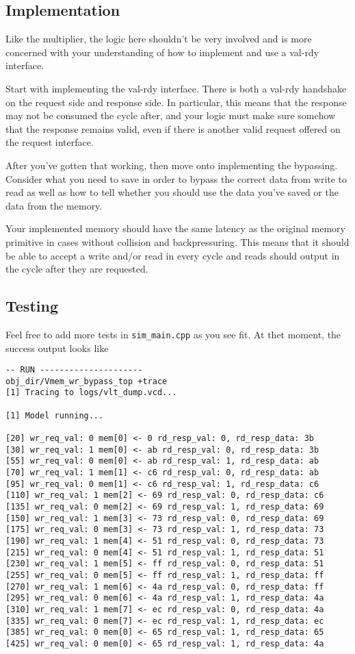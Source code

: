 \documentclass{article}
\begin{document}
\subsection*{Implementation}
Like the multiplier, the logic here shouldn't be very involved and is more
concerned with your understanding of how to implement and use a val-rdy
interface.

Start with implementing the val-rdy interface. There is both a val-rdy handshake
on the request side and response side. In particular, this means that the
response may not be consumed the cycle after, and your logic must make sure
somehow that the response remains valid, even if there is another valid request
offered on the request interface.

After you've gotten that working, then move onto implementing the bypassing.
Consider what you need to save in order to bypass the correct data from write to
read as well as how to tell whether you should use the data you've saved or the
data from the memory.

Your implemented memory should have the same latency as the original memory
primitive in cases without collision and backpressuring. This means that it
should be able to accept a write and/or read in every cycle and reads should
output in the cycle after they are requested.

\subsection*{Testing}
Feel free to add more tests in \texttt{sim\_main.cpp} as you see fit. At thet
moment, the success output looks like
\begin{verbatim}
-- RUN ---------------------
obj_dir/Vmem_wr_bypass_top +trace
[1] Tracing to logs/vlt_dump.vcd...

[1] Model running...

[20] wr_req_val: 0 mem[0] <- 0 rd_resp_val: 0, rd_resp_data: 3b
[30] wr_req_val: 1 mem[0] <- ab rd_resp_val: 0, rd_resp_data: 3b
[55] wr_req_val: 0 mem[0] <- ab rd_resp_val: 1, rd_resp_data: ab
[70] wr_req_val: 1 mem[1] <- c6 rd_resp_val: 0, rd_resp_data: ab
[95] wr_req_val: 0 mem[1] <- c6 rd_resp_val: 1, rd_resp_data: c6
[110] wr_req_val: 1 mem[2] <- 69 rd_resp_val: 0, rd_resp_data: c6
[135] wr_req_val: 0 mem[2] <- 69 rd_resp_val: 1, rd_resp_data: 69
[150] wr_req_val: 1 mem[3] <- 73 rd_resp_val: 0, rd_resp_data: 69
[175] wr_req_val: 0 mem[3] <- 73 rd_resp_val: 1, rd_resp_data: 73
[190] wr_req_val: 1 mem[4] <- 51 rd_resp_val: 0, rd_resp_data: 73
[215] wr_req_val: 0 mem[4] <- 51 rd_resp_val: 1, rd_resp_data: 51
[230] wr_req_val: 1 mem[5] <- ff rd_resp_val: 0, rd_resp_data: 51
[255] wr_req_val: 0 mem[5] <- ff rd_resp_val: 1, rd_resp_data: ff
[270] wr_req_val: 1 mem[6] <- 4a rd_resp_val: 0, rd_resp_data: ff
[295] wr_req_val: 0 mem[6] <- 4a rd_resp_val: 1, rd_resp_data: 4a
[310] wr_req_val: 1 mem[7] <- ec rd_resp_val: 0, rd_resp_data: 4a
[335] wr_req_val: 0 mem[7] <- ec rd_resp_val: 1, rd_resp_data: ec
[385] wr_req_val: 0 mem[0] <- 65 rd_resp_val: 1, rd_resp_data: 65
[425] wr_req_val: 0 mem[0] <- 65 rd_resp_val: 1, rd_resp_data: 4a
\end{verbatim}
\end{document}
